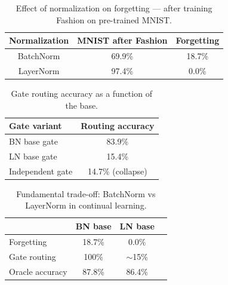 \begin{table}[h]
\centering
\caption{Effect of normalization on forgetting --- after training Fashion on pre-trained MNIST.}
\begin{tabular}{c c c}
\hline
\textbf{Normalization} & \textbf{MNIST after Fashion} & \textbf{Forgetting} \\
\hline
BatchNorm & 69.9\% & 18.7\% \\
LayerNorm & 97.4\% & 0.0\% \\
\hline
\end{tabular}
\end{table}

\begin{table}[h]
\centering
\caption{Gate routing accuracy as a function of the base.}
\begin{tabular}{l c}
\hline
\textbf{Gate variant} & \textbf{Routing accuracy} \\
\hline
BN base gate & 83.9\% \\
LN base gate & 15.4\% \\
Independent gate & 14.7\% (collapse) \\
\hline
\end{tabular}
\end{table}

\begin{table}[h]
\centering
\caption{Fundamental trade-off: BatchNorm vs LayerNorm in continual learning.}
\begin{tabular}{l c c c}
\hline
& \textbf{BN base} & \textbf{LN base} \\
\hline
Forgetting & 18.7\% & 0.0\% \\
Gate routing & 100\% & $\sim$15\% \\
Oracle accuracy & 87.8\% & 86.4\% \\
\hline
\end{tabular}
\end{table}

